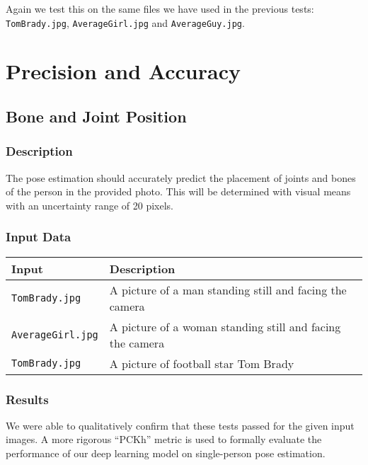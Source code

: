 \documentclass{scrreprt}
\begin{document}
Again we test this on the same files we have used in the previous tests:
\verb|TomBrady.jpg|, \verb|AverageGirl.jpg| and \verb|AverageGuy.jpg|.

\section{Precision and Accuracy}
\subsection{Bone and Joint Position}
\subsubsection{Description}

The pose estimation should accurately predict the placement of joints and bones
of the person in the provided photo. This will be determined with visual means
with an uncertainty range of 20 pixels.

\subsubsection{Input Data}

\begin{table}[H]
        \centering
        \begin{tabular}{p{3cm}p{6cm}}
                \hline\hline
                Input & Description\\
                \hline\hline
                \verb|TomBrady.jpg| &  A picture of a man standing still and facing the camera\\
                \hline
                \verb|AverageGirl.jpg| &  A picture of a woman standing still and facing the camera\\
                \hline
                \verb|TomBrady.jpg| &  A picture of football star Tom Brady\\
                \hline
        \end{tabular}
\end{table}

\subsubsection{Results}

We were able to qualitatively confirm that these tests passed for the given
input images. A more rigorous ``PCKh'' metric is used to formally evaluate the
performance of our deep learning model on single-person pose estimation.
\end{document}
